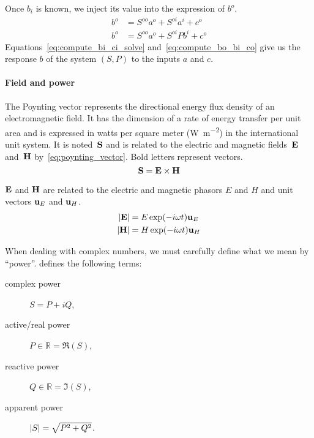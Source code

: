 Once $b_i$ is known, we inject its value into the expression of $b^o$.
\begin{subequations}
    \begin{align}
        b^o &= S^{oo} a^o + S^{oi} a^i + c^o \label{eq:compute_bo_ai_co}\\
        b^o &= S^{oo} a^o + S^{oi} Pb^i + c^o \label{eq:compute_bo_bi_co}
    \end{align}
    \label{eq:compute_bo_co}
\end{subequations}
Equations~\eqref{eq:compute_bi_ci_solve} and~\eqref{eq:compute_bo_bi_co} give us the response $b$ of the system $(S, P)$ to the inputs $a$ and $c$.

\paragraph{Field and power}
The Poynting vector represents the directional energy flux density of an electromagnetic field.
It has the dimension of a rate of energy transfer per unit area
and is expressed in watts per square meter (\si{\watt\per\meter\squared}) in the international unit system.
It is noted~$\textbf{S}$ and is related to the electric and magnetic fields~$\textbf{E}$ and~$\textbf{H}$ by~\eqref{eq:poynting_vector}.
Bold letters represent vectors.
\begin{equation}
    \textbf{S} = \textbf{E} \times \textbf{H} \label{eq:poynting_vector}
\end{equation}

$\textbf{E}$ and $\textbf{H}$ are related to the electric and magnetic phasors $E$ and $H$ and unit vectors $\textbf{u}_E$ and $\textbf{u}_H$.
\begin{align}
    \left| \textbf{E} \right| &= E \exp(-i\omega t) \textbf{u}_E\\
    \left| \textbf{H} \right| &= H \exp(-i\omega t) \textbf{u}_H
\end{align}
    

When dealing with complex numbers, we must carefully define what we mean by ``power''.
 \cite{IEEE2002dictionary} defines the following terms:
\begin{description}
    \item[complex power] $S = P + iQ$,
    \item[active/real power] $P \in \mathbb{R} = \Re(S)$,
    \item[reactive power] $Q \in \mathbb{R} = \Im(S)$,
    \item[apparent power] $\left| S \right| = \sqrt{P^2 + Q^2}$.
\end{description}


